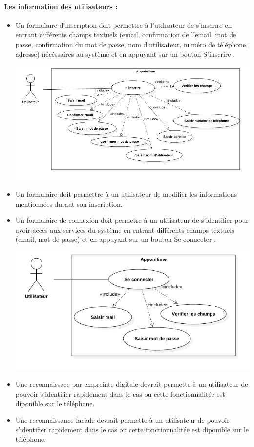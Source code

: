 \documentclass{article}
\begin{document}
\paragraph{Les information des utilisateurs :}
\begin{itemize}
 \item Un formulaire d'inscription doit permettre à l'utilisateur de
   s'inscrire en entrant différents champs textuels (email,
   confirmation de l'email, mot de
   passe, confirmation du mot de passe, nom d'utilisateur, numéro de téléphone, adresse) nécéssaires au
   système et en appuyant sur
   un bouton \og S'inscrire \fg{}.

\includegraphics[scale=0.5]{ShematDiagrammes/useCaseInscription.jpg}

\item Un formulaire doit permettre à un utilisateur de modifier les
  informations mentionnées durant son inscription.
\item Un formulaire de connexion doit permetre à un utilisateur de
  s'identifier pour avoir accès aux services du système en entrant
  différents champs textuels (email, mot de passe) et en appuyant sur
  un bouton \og Se connecter \fg{}.

\includegraphics[scale=0.5]{ShematDiagrammes/useCaseConnexion.jpg}

\item Une reconnaissace par empreinte digitale devrait permette à un
  utilisateur de pouvoir s'identifier rapidement dans le cas ou cette
  fonctionnalitée est diponible sur le téléphone.
\item Une reconnaissance faciale devrait permette à un
  utilisateur de pouvoir s'identifier rapidement dans le cas ou cette
  fonctionnalitée est diponible sur le téléphone.
\end{itemize}
\end{document}
